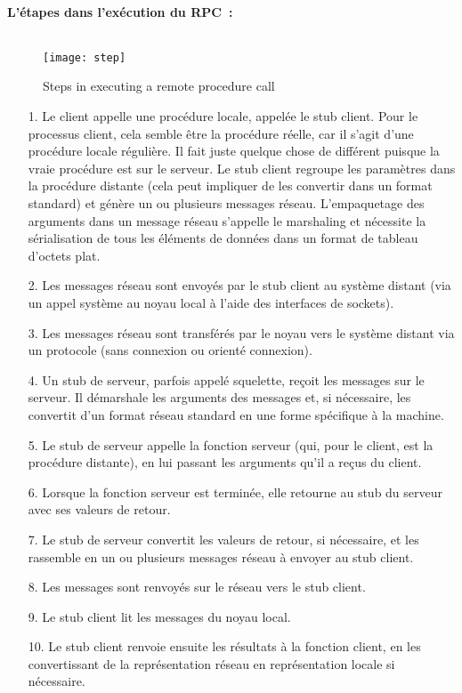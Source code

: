 \textbf{\\L'étapes dans l'exécution du RPC :}\\\\
\begin{figure}[!ht]
	\centering
	\texttt{[image: step]}
	\caption{Steps in executing a remote procedure call}\label{step}
\end{figure}

\begin{enumerate}
	\item[1.] Le client appelle une procédure locale, appelée le stub client. Pour le processus client, cela semble être la procédure réelle, car il s'agit d'une procédure locale régulière. Il fait juste quelque chose de différent puisque la vraie procédure est sur le serveur. Le stub client regroupe les paramètres dans la procédure distante (cela peut impliquer de les convertir dans un format standard) et génère un ou plusieurs messages réseau. L'empaquetage des arguments dans un message réseau s'appelle le marshaling et nécessite la sérialisation de tous les éléments de données dans un format de tableau d'octets plat.
	\item[2.] Les messages réseau sont envoyés par le stub client au système distant (via un appel système au noyau local à l'aide des interfaces de sockets).
	\item[3.] Les messages réseau sont transférés par le noyau vers le système distant via un protocole (sans connexion ou orienté connexion).
	\item[4.] Un stub de serveur, parfois appelé squelette, reçoit les messages sur le serveur. Il démarshale les arguments des messages et, si nécessaire, les convertit d'un format réseau standard en une forme spécifique à la machine.
	\item[5.] Le stub de serveur appelle la fonction serveur (qui, pour le client, est la procédure distante), en lui passant les arguments qu'il a reçus du client.
	\item[6.] Lorsque la fonction serveur est terminée, elle retourne au stub du serveur avec ses valeurs de retour.
	\item[7.] Le stub de serveur convertit les valeurs de retour, si nécessaire, et les rassemble en un ou plusieurs messages réseau à envoyer au stub client.
	\item[8.] Les messages sont renvoyés sur le réseau vers le stub client.
	\item[9.] Le stub client lit les messages du noyau local.
	\item[10.] Le stub client renvoie ensuite les résultats à la fonction client, en les convertissant de la représentation réseau en représentation locale si nécessaire.
\end{enumerate}
